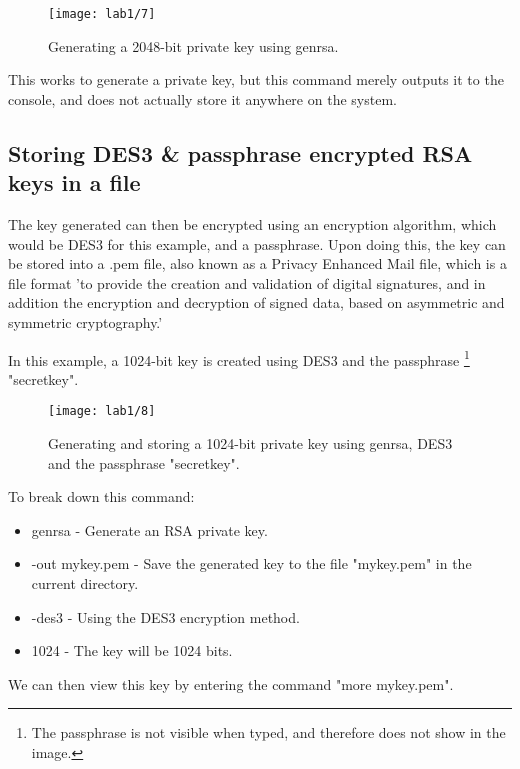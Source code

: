 \begin{figure}[H]
    \centering
    \texttt{[image: lab1/7]}
    \caption{Generating a 2048-bit private key using genrsa.}
    \label{fig:genrsa}
\end{figure}

This works to generate a private key, but this command merely outputs it to the console, and does not actually
store it anywhere on the system.

\pagebreak

\subsection{Storing DES3 \& passphrase encrypted RSA keys in a file}\label{subsec:storing-keys-in-file}
The key generated can then be encrypted using an encryption algorithm, which would be DES3 for this example,
and a passphrase.
Upon doing this, the key can be stored into a .pem file, also known as a Privacy Enhanced Mail file, which is
a file format 'to provide the creation and validation of digital signatures, and in addition the
encryption and decryption of signed data, based on asymmetric and symmetric cryptography.'
~\autocite[p. 1894]{PEMFormat}

In this example, a 1024-bit key is created using DES3 and the passphrase
\footnote{The passphrase is not visible when typed, and therefore does not show in the image.} "secretkey".

\begin{figure}[H]
    \centering
    \texttt{[image: lab1/8]}
    \caption{Generating and storing a 1024-bit private key using genrsa, DES3 and the passphrase "secretkey".}
    \label{fig:DES3Key}
\end{figure}

To break down this command:
\begin{itemize}
    \item genrsa - Generate an RSA private key.
    \item -out mykey.pem - Save the generated key to the file "mykey.pem" in the current directory.
    \item -des3 - Using the DES3 encryption method.
    \item 1024 - The key will be 1024 bits.\newline
\end{itemize}


We can then view this key by entering the command "more mykey.pem".

